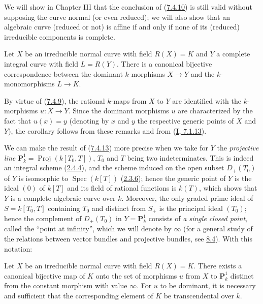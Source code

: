 
\begin{remark}[7.4.12]
\label{II.7.4.12}
We will show in Chapter III that the conclusion of
(\hyperref[II.7.4.10]{7.4.10}) is still valid without supposing the curve
normal (or even reduced); we will also show that an algebraic curve
(reduced or not) is affine if and only if none of its (reduced) irreducible
components is complete.
\end{remark}

\begin{corollary}[7.4.13]
\label{II.7.4.13}
Let $X$ be an irreducible \textup{normal} curve with field $R(X)=K$ and $Y$ a \textup{complete}
integral curve with field $L=R(Y)$. There is a canonical bijective
correspondence between the \textup{dominant} $k$-morphisms $X\to Y$ and the
$k$-monomorphisms $L\to K$.
\end{corollary}

By virtue of (\hyperref[II.7.4.9]{7.4.9}), the rational $k$-maps
from $X$ to $Y$ are identified with the $k$-morphisms $u:X\to Y$. Since the
dominant morphisms $u$ are characterized by the fact that $u(x)=y$ (denoting by
$x$ and $y$ the respective generic points of $X$ and $Y$), the corollary
follows from these remarks and from (\hyperref[I.7.1.13]{\textbf{I}, 7.1.13}).

\begin{env}[7.4.14]
\label{II.7.4.14}
We can make the result of (\hyperref[II.7.4.13]{7.4.13}) more precise when we
take for $Y$ the \emph{projective line}
$\mathbf{P}_k^1=\operatorname{Proj}(k[T_0,T])$, $T_0$ and $T$ being two
indeterminates. This is indeed an integral scheme
(\hyperref[II.2.4.4]{2.4.4}), and the scheme induced on the open subset
$D_+(T_0)$ of $Y$ is isomorphic to $\operatorname{Spec}(k[T])$
(\hyperref[II.2.3.6]{2.3.6}); hence the generic point of $Y$ is the ideal
$(0)$ of $k[T]$ and its field of rational functions is $k(T)$, which shows
that $Y$ is a complete algebraic curve over $k$. Moreover, the only graded
prime ideal of $S=k[T_0,T]$ containing $T_0$ and distinct from $S_+$ is
the principal ideal $(T_0)$; hence the complement of $D_+(T_0)$ in
$Y=\mathbf{P}_k^1$ consists of \emph{a single closed point}, called the
``point at infinity'', which we will denote by $\infty$ (for a general study
of the relations between vector bundles and projective bundles, see
\hyperref[subsection:II.8.4]{8.4}). With this notation:
\end{env}

\begin{corollary}[7.4.15]
\label{II.7.4.15}
Let $X$ be an irreducible \textup{normal} curve with field $R(X)=K$. There exists a
canonical bijective map of $K$ onto the set of morphisms $u$ from
$X$ to $\mathbf{P}_k^1$ distinct from the constant morphism with value
$\infty$. For $u$ to be dominant, it is necessary and sufficient that the
corresponding element of $K$ be transcendental over $k$.
\end{corollary}

